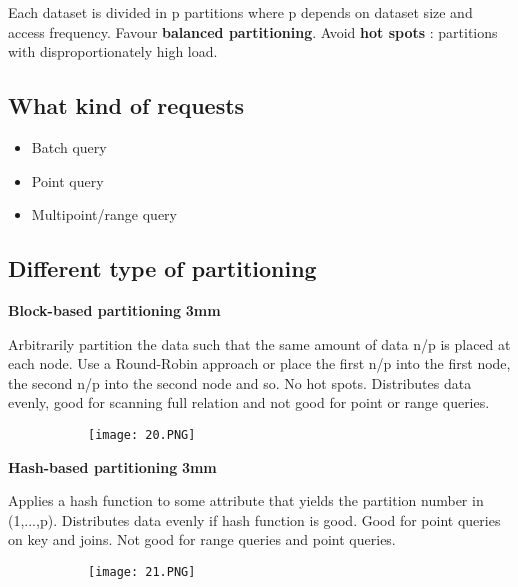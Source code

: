 \documentclass{article}
\begin{document}
Each dataset is divided in p partitions where p depends on dataset size and access frequency.
Favour \textbf{balanced partitioning}. Avoid \textbf{hot spots} : partitions with disproportionately high load.

\subsection{What kind of requests}
\begin{itemize}
\item Batch query 
\item Point query 
\item Multipoint/range query 
\end{itemize}

\subsection{Different type of partitioning}

\vspace{3mm}
\textbf{Block-based partitioning}
\textbf{3mm}

Arbitrarily partition the data such that the same amount of data n/p is placed at each node. Use a Round-Robin approach or place the first n/p into the first node, the second n/p into the second node and so. No hot spots.
Distributes data evenly, good for scanning full relation and not good for point or range queries.

\begin{figure}[ht!]
  \centering
  \begin{subfigure}[b]{0.30\linewidth}
    \texttt{[image: 20.PNG]}
  \end{subfigure}
\end{figure}

\vspace{50mm}
\textbf{Hash-based partitioning}
\textbf{3mm}

Applies a hash function to some attribute that yields the partition number in (1,...,p). Distributes data evenly if hash function is good. Good for point queries on key and joins. Not good for range queries and point queries.

\begin{figure}[ht!]
  \centering
  \begin{subfigure}[b]{0.30\linewidth}
    \texttt{[image: 21.PNG]}
  \end{subfigure}
\end{figure}
\end{document}
